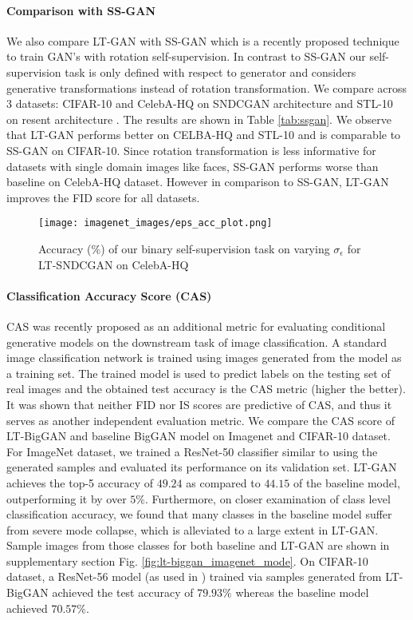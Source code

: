 \documentclass[10pt,twocolumn,letterpaper]{article}
\begin{document}
\paragraph{Comparison with SS-GAN}
We also compare LT-GAN with SS-GAN \cite{rot_ssgan2019chen} which is a recently proposed technique to train GAN's with rotation self-supervision. In contrast to SS-GAN our self-supervision task is only defined with respect to generator and considers generative transformations instead of rotation transformation. We compare across 3 datasets: CIFAR-10 and CelebA-HQ on SNDCGAN architecture and STL-10 on resent architecture \cite{sngan_proj}. The results are shown in Table \ref{tab:ssgan}. We observe that LT-GAN performs better on CELBA-HQ and STL-10 and is comparable to SS-GAN on CIFAR-10. Since rotation transformation is less informative for datasets with single domain images like faces, SS-GAN performs worse than baseline on CelebA-HQ dataset. However in comparison to SS-GAN, LT-GAN improves the FID score for all datasets. 

\begin{figure}[t]
\centering
    \texttt{[image: imagenet\_images/eps\_acc\_plot.png]}
    \caption{\footnotesize{Accuracy (\%) of our binary self-supervision task on varying $\sigma_\epsilon$ for LT-SNDCGAN on CelebA-HQ}}
    \label{fig:eps_acc_plot}
\end{figure}


\paragraph{Classification Accuracy Score (CAS)}
CAS \cite{cas2019metric} was recently proposed as an additional metric for evaluating conditional generative models on the downstream task of image classification. A standard image classification network is trained using images generated from the model as a training set. The trained model is used to predict labels on the testing set of real images and the obtained test accuracy is the CAS metric (higher the better). It was shown that neither FID \cite{fid2017martin} nor IS\cite{inception2016} scores are predictive of CAS, and thus it serves as another independent evaluation metric. We compare the CAS score of LT-BigGAN and baseline BigGAN model on Imagenet and CIFAR-10 dataset. For ImageNet dataset, we trained a ResNet-50 \cite{resnet2015He} classifier similar to \cite{cas2019metric} using the generated samples and evaluated its performance on its validation set. LT-GAN achieves the top-5 accuracy of $49.24$ as compared to $44.15$ of the baseline model, outperforming it by over $5\%$. Furthermore, on closer examination of class level classification accuracy, we found that many classes in the baseline model suffer from severe mode collapse, which is alleviated to a large extent in LT-GAN. Sample images from those classes for both baseline and LT-GAN are shown in supplementary section Fig. \ref{fig:lt-biggan_imagenet_mode}. On CIFAR-10 dataset, a ResNet-56 model (as used in \cite{cas2019metric}) trained via samples generated from LT-BigGAN achieved the test accuracy of $79.93 \%$ whereas the baseline model achieved $70.57 \%$. 
\end{document}
